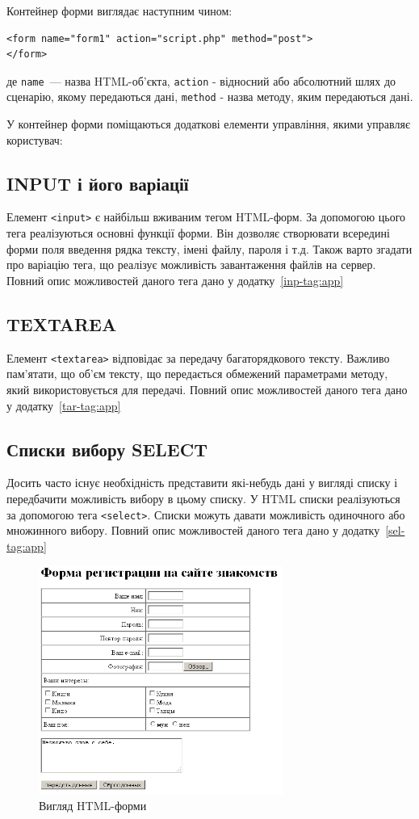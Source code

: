 Контейнер форми виглядає наступним чином:
\begin{verbatim}
<form name="form1" action="script.php" method="post">
</form>
\end{verbatim}
де \verb'name'~--- назва HTML-об'єкта, \verb'action' - відносний або абсолютний шлях до сценарію, якому передаються дані, \verb'method' - назва методу, яким передаються дані.

У контейнер форми поміщаються додаткові елементи управління, якими управляє користувач:

\subsection*{INPUT і його варіації}
Елемент \verb'<input>' є найбільш вживаним тегом HTML-форм. За допомогою цього тега реалізуються основні функції форми. Він дозволяє створювати всередині форми поля введення рядка тексту, імені файлу, пароля і т.д. Також варто згадати про варіацію тега, що реалізує можливість завантаження файлів на сервер. Повний опис можливостей даного тега дано у додатку~\ref{inp-tag:app}
\subsection*{TEXTAREA}
Елемент \verb'<textarea>' відповідає за передачу багаторядкового тексту. Важливо пам'ятати, що об'єм тексту, що передається обмежений параметрами методу, який використовується для передачі. Повний опис можливостей даного тега дано у додатку~\ref{tar-tag:app}
\subsection*{Списки вибору SELECT}
Досить часто існує необхідність представити які-небудь дані у вигляді списку і передбачити можливість вибору в цьому списку. У HTML списки реалізуються за допомогою тега \verb'<select>'. Списки можуть давати можливість одиночного або множинного вибору. Повний опис можливостей даного тега дано у додатку~\ref{sel-tag:app}

\begin{figure}
\includegraphics[scale=1,width=8cm]{ch02-01.png}
\caption{Вигляд HTML-форми}
\label{f2-1:image}
\end{figure}


